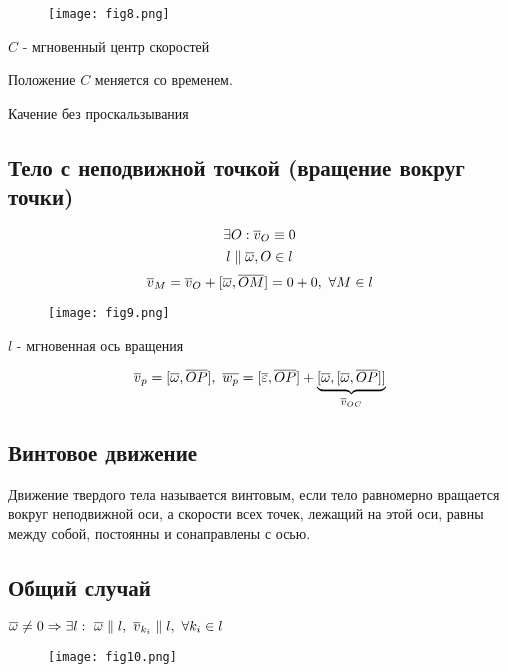   \begin{figure}[H]
  \centering
  \texttt{[image: fig8.png]} 
  \end{figure}  

  \begin{df}
  $C$ - мгновенный центр скоростей
  \end{df}
  \begin{ntc}
  Положение $C$ меняется со временем.
  \end{ntc}
  \begin{xmp}
  Качение без проскальзывания
  \end{xmp}

  \subsection{Тело с неподвижной точкой (вращение вокруг точки)}
  $$ \exists O: {\overline{v}}_O \equiv 0 $$
  $$ l \parallel {\overline{\omega}}, O \in l $$
  $$ {\overline{v}}_M = {\overline{v}}_O + [{\overline{\omega}}, {\overline{OM}}] = 0 + 0,~ \forall M \in l $$
  \begin{figure}[H]
  \centering
  \texttt{[image: fig9.png]} 
  \end{figure}  

  \begin{df} 
  $l$ - мгновенная ось вращения 
  \end{df}
  $$ {\overline{v}}_p = [{\overline{\omega}}, {\overline{OP}}],~ {\overline{w_p}} = [{\overline{\varepsilon}}, {\overline{OP}}] + \underbrace{[{\overline{\omega}}, [ {\overline{\omega}}, \overline{OP}]]}_{{\overline{v}}_{OC}} $$
  \subsection{Винтовое движение}
  \begin{df} 
  Движение твердого тела называется винтовым, если тело равномерно вращается вокруг неподвижной оси, а скорости всех точек, лежащий на этой оси, равны между собой, постоянны и сонаправлены с осью.
  \end{df}
  \subsection{Общий случай}
  \begin{teo}
  $ {\overline{\omega}} \neq 0 \Rightarrow \exists l:~ {\overline{\omega}} \parallel l,~ {\overline{v}}_{k_i} \parallel l,~ \forall k_i \in l$
  \end{teo}
  \begin{figure}[H]
  \centering
  \texttt{[image: fig10.png]} 
  \end{figure}  

